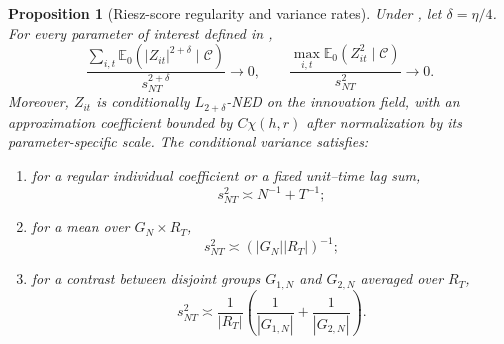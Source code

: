 \documentclass[11pt]{article}
\numberwithin{equation}{section}
\newtheorem{proposition}{Proposition}
\theoremstyle{remark}
\newcommand{\Ezero}{\mathbb E_0}
\begin{document}
\begin{proposition}[Riesz-score regularity and variance rates]
\label{prop:target_score}
Under , let $\delta=\eta/4$. For every parameter of interest defined in ,
\begin{equation}
\label{eq:score_lyapunov}
\frac{
\sum_{i,t}
\Ezero(|Z_{it}|^{2+\delta}\mid\mathscr C)
}{
s_{NT}^{2+\delta}
}
\longrightarrow0,
\qquad
\frac{
\max_{i,t}\Ezero(Z_{it}^2\mid\mathscr C)
}{
s_{NT}^2
}
\longrightarrow0.
\end{equation}
Moreover, $Z_{it}$ is conditionally $L_{2+\delta}$-NED on the innovation field, with an approximation coefficient bounded by $C\chi(h,r)$ after normalization by its parameter-specific scale. The conditional variance satisfies:
\begin{enumerate}[label=(\alph*),leftmargin=2em]
\item for a regular individual coefficient or a fixed unit--time lag sum,
$$
s_{NT}^2\asymp N^{-1}+T^{-1};
$$
\item for a mean over $G_N\times R_T$,
$$
s_{NT}^2\asymp (|G_N||R_T|)^{-1};
$$
\item for a contrast between disjoint groups $G_{1,N}$ and $G_{2,N}$ averaged over $R_T$,
$$
s_{NT}^2
\asymp
\frac1{|R_T|}
\left(
\frac1{|G_{1,N}|}
+
\frac1{|G_{2,N}|}
\right).
$$
\end{enumerate}
\end{proposition}
\end{document}
